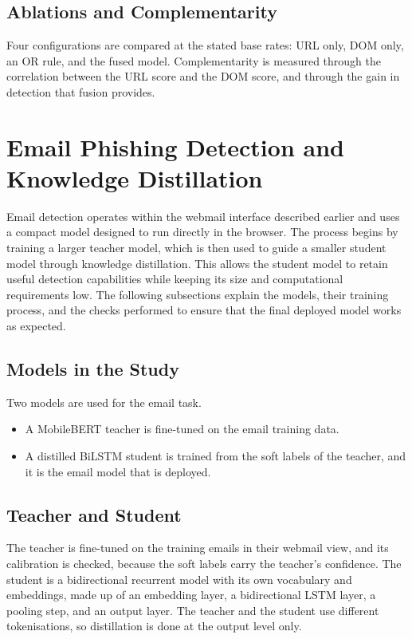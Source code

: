 \documentclass{FastFyp}
\begin{document}
\subsection{Ablations and Complementarity}
Four configurations are compared at the stated base rates: URL only, DOM only, an OR rule, and the fused model. Complementarity is measured through the correlation between the URL score and the DOM score, and through the gain in detection that fusion provides.

\section{Email Phishing Detection and Knowledge Distillation}
\label{sec:email}
Email detection operates within the webmail interface described earlier and uses a compact model designed to run directly in the browser. The process begins by training a larger teacher model, which is then used to guide a smaller student model through knowledge distillation. This allows the student model to retain useful detection capabilities while keeping its size and computational requirements low. The following subsections explain the models, their training process, and the checks performed to ensure that the final deployed model works as expected.

\subsection{Models in the Study}
Two models are used for the email task.
\begin{itemize}
    \item A MobileBERT teacher is fine-tuned on the email training data.
    \item A distilled BiLSTM student is trained from the soft labels of the teacher, and it is the email model that is deployed.
\end{itemize}

\subsection{Teacher and Student}
The teacher is fine-tuned on the training emails in their webmail view, and its calibration is checked, because the soft labels carry the teacher's confidence. The student is a bidirectional recurrent model with its own vocabulary and embeddings, made up of an embedding layer, a bidirectional LSTM layer, a pooling step, and an output layer. The teacher and the student use different tokenisations, so distillation is done at the output level only.
\end{document}
